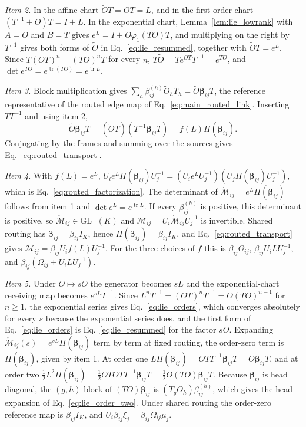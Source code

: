 \documentclass[twoside,11pt]{article}
\begin{document}
\emph{Item 2.} In the affine chart $\widetilde OT=OT=L$, and in the first-order chart $(T^{-1}+O)T=I+L$. In the exponential chart, Lemma~\ref{lem:lie_lowrank} with $A=O$ and $B=T$ gives $e^{L}=I+O\varphi_1(TO)T$, and multiplying on the right by $T^{-1}$ gives both forms of $\widetilde O$ in Eq.~\eqref{eq:lie_resummed}, together with $\widetilde OT=e^{L}$. Since $T(OT)^n=(TO)^nT$ for every $n$, $T\widetilde O=Te^{OT}T^{-1}=e^{TO}$, and $\det e^{TO}=e^{\operatorname{tr}(TO)}=e^{\operatorname{tr}L}$.

\emph{Item 3.} Block multiplication gives $\sum_h\beta_{ij}^{(h)}\widetilde O_hT_h=\widetilde O\boldsymbol\beta_{ij}T$, the reference representative of the routed edge map of Eq.~\eqref{eq:main_routed_link}. Inserting $TT^{-1}$ and using item 2,
\begin{equation}
\widetilde O\boldsymbol\beta_{ij}T=(\widetilde OT)(T^{-1}\boldsymbol\beta_{ij}T)=f(L)\Pi(\boldsymbol\beta_{ij}).
\label{eq:app_routed_reference}
\end{equation}
Conjugating by the frames and summing over the sources gives Eq.~\eqref{eq:routed_transport}.

\emph{Item 4.} With $f(L)=e^{L}$, $U_ie^{L}\Pi(\boldsymbol\beta_{ij})U_j^{-1}=(U_ie^{L}U_j^{-1})(U_j\Pi(\boldsymbol\beta_{ij})U_j^{-1})$, which is Eq.~\eqref{eq:routed_factorization}. The determinant of $\mathring{\mathcal M}_{ij}=e^{L}\Pi(\boldsymbol\beta_{ij})$ follows from item 1 and $\det e^{L}=e^{\operatorname{tr}L}$. If every $\beta_{ij}^{(h)}$ is positive, this determinant is positive, so $\mathring{\mathcal M}_{ij}\in\mathrm{GL}^+(K)$ and $\mathcal M_{ij}=U_i\mathring{\mathcal M}_{ij}U_j^{-1}$ is invertible. Shared routing has $\boldsymbol\beta_{ij}=\beta_{ij}I_K$, hence $\Pi(\boldsymbol\beta_{ij})=\beta_{ij}I_K$, and Eq.~\eqref{eq:routed_transport} gives $\mathcal M_{ij}=\beta_{ij}U_if(L)U_j^{-1}$. For the three choices of $f$ this is $\beta_{ij}\Theta_{ij}$, $\beta_{ij}U_iLU_j^{-1}$, and $\beta_{ij}(\Omega_{ij}+U_iLU_j^{-1})$.

\emph{Item 5.} Under $O\mapsto sO$ the generator becomes $sL$ and the exponential-chart receiving map becomes $e^{sL}T^{-1}$. Since $L^nT^{-1}=(OT)^nT^{-1}=O(TO)^{n-1}$ for $n\ge1$, the exponential series gives Eq.~\eqref{eq:lie_orders}, which converges absolutely for every $s$ because the exponential series does, and the first form of Eq.~\eqref{eq:lie_orders} is Eq.~\eqref{eq:lie_resummed} for the factor $sO$. Expanding $\mathring{\mathcal M}_{ij}(s)=e^{sL}\Pi(\boldsymbol\beta_{ij})$ term by term at fixed routing, the order-zero term is $\Pi(\boldsymbol\beta_{ij})$, given by item 1. At order one $L\Pi(\boldsymbol\beta_{ij})=OTT^{-1}\boldsymbol\beta_{ij}T=O\boldsymbol\beta_{ij}T$, and at order two $\tfrac12L^2\Pi(\boldsymbol\beta_{ij})=\tfrac12OTOTT^{-1}\boldsymbol\beta_{ij}T=\tfrac12O(TO)\boldsymbol\beta_{ij}T$. Because $\boldsymbol\beta_{ij}$ is head diagonal, the $(g,h)$ block of $(TO)\boldsymbol\beta_{ij}$ is $(T_gO_h)\beta_{ij}^{(h)}$, which gives the head expansion of Eq.~\eqref{eq:lie_order_two}. Under shared routing the order-zero reference map is $\beta_{ij}I_K$, and $U_i\beta_{ij}\xi_j=\beta_{ij}\Omega_{ij}\mu_j$.
\end{document}

